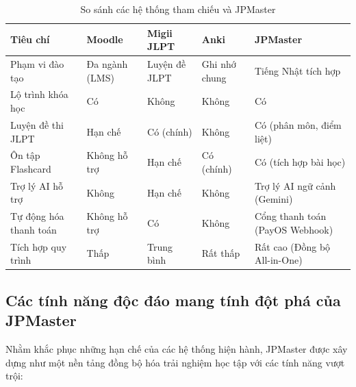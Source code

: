 \documentclass[../DoAn.tex]{subfiles}
\begin{document}
\begin{table}[H]
\centering
\small
\setlength{\tabcolsep}{4pt}
\renewcommand{\arraystretch}{1.25}


\begin{tabular}{|p{3.4cm}|p{2.15cm}|p{2.15cm}|p{2.0cm}|p{2.85cm}|}
\hline
Tiêu chí & Moodle & Migii JLPT & Anki & JPMaster \\
\hline
Phạm vi đào tạo & Đa ngành (LMS) & Luyện đề JLPT & Ghi nhớ chung & Tiếng Nhật tích hợp \\
\hline
Lộ trình khóa học & Có & Không & Không & Có \\
\hline
Luyện đề thi JLPT & Hạn chế & Có (chính) & Không & Có (phân môn, điểm liệt) \\
\hline
Ôn tập Flashcard & Không hỗ trợ & Hạn chế & Có (chính) & Có (tích hợp bài học) \\
\hline
Trợ lý AI hỗ trợ & Không & Hạn chế & Không & Trợ lý AI ngữ cảnh (Gemini) \\
\hline
Tự động hóa thanh toán & Không hỗ trợ & Có & Không & Cổng thanh toán (PayOS Webhook) \\
\hline
Tích hợp quy trình & Thấp & Trung bình & Rất thấp & Rất cao (Đồng bộ All-in-One) \\
\hline
\end{tabular}
\caption{So sánh các hệ thống tham chiếu và JPMaster}
\label{tab:comparison_existing_systems}
\end{table}

\subsection*{Các tính năng độc đáo mang tính đột phá của JPMaster}

Nhằm khắc phục những hạn chế của các hệ thống hiện hành, JPMaster được xây dựng như một nền tảng đồng bộ hóa trải nghiệm học tập với các tính năng vượt trội:
\end{document}
